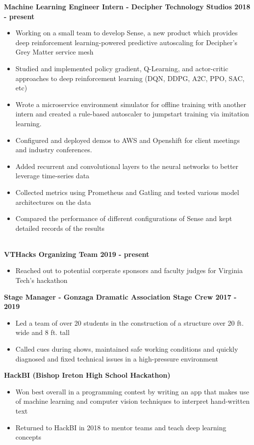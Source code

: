 \documentclass{article}
\begin{document}
\begin{center}
\begin{flushleft}
    \textbf{Machine Learning Engineer Intern - Decipher Technology Studios \hfill 2018 - present}
    \begin{itemize}
      \item Working on a small team to develop Sense, a new product which provides deep reinforcement learning-powered predictive autoscaling for Decipher’s Grey Matter service mesh
      \item Studied and implemented policy gradient, Q-Learning, and actor-critic approaches to deep reinforcement learning (DQN, DDPG, A2C, PPO, SAC, etc)
      \item Wrote a microservice environment simulator for offline training with another intern and created a rule-based autoscaler to jumpstart training via imitation learning.
      \item Configured and deployed demos to AWS and Openshift for client meetings and industry conferences.
      \item Added recurrent and convolutional layers to the neural networks to better leverage time-series data
      \item Collected metrics using Prometheus and Gatling and tested various model architectures on the data
      \item Compared the performance of different configurations of Sense and kept detailed records of the results
    \end{itemize}


    {\large\textbf{\underline{}}} \\
    
    \textbf{VTHacks Organizing Team \hfill 2019 - present}
    \begin{itemize}
      \item Reached out to potential corperate sponsors and faculty judges for Virginia Tech's hackathon
    \end{itemize}
    
    \textbf{Stage Manager - Gonzaga Dramatic Association Stage Crew \hfill 2017 - 2019}
    \begin{itemize}
      \item Led a team of over 20 students in the construction of a structure over 20 ft. wide and 8 ft. tall
      \item Called cues during shows, maintained safe working conditions and quickly diagnosed and fixed technical issues in a high-pressure environment
    \end{itemize}

    \textbf{HackBI  (Bishop Ireton High School Hackathon)}
    \begin{itemize}
      \item Won best overall in a programming contest by writing an app that makes use of machine learning and computer vision techniques to interpret hand-written text
      \item Returned to HackBI in 2018 to mentor teams and teach deep learning concepts
    \end{itemize}



\end{flushleft}
\end{center}
\end{document}
